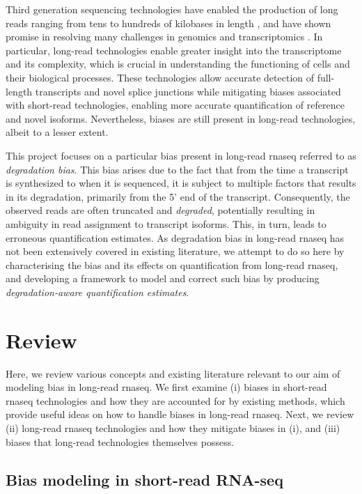 
Third generation sequencing technologies have enabled the production of long reads ranging from tens to hundreds of kilobases in length \cite{Pollard2018}, and have shown promise in resolving many challenges in genomics and transcriptomics \cite{Bolisetty2015, Byrne2017, DeCoster2019, Liu2019, Mantere2019, Nurk2021}. In particular, long-read technologies enable greater insight into the transcriptome and its complexity, which is crucial in understanding the functioning of cells and their biological processes. These technologies allow accurate detection of full-length transcripts and novel splice junctions while mitigating biases associated with short-read technologies, enabling more accurate quantification of reference and novel isoforms. Nevertheless, biases are still present in long-read technologies, albeit to a lesser extent. 

This project focuses on a particular bias present in long-read \gls{rnaseq} referred to as \textit{degradation bias}. This bias arises due to the fact that from the time a transcript is synthesized to when it is sequenced, it is subject to multiple factors that results in its degradation, primarily from the 5' end of the transcript. Consequently, the observed reads are often truncated and \textit{degraded}, potentially resulting in ambiguity in read assignment to transcript isoforms. This, in turn, leads to erroneous quantification estimates. As degradation bias in long-read \gls{rnaseq} has not been extensively covered in existing literature, we attempt to do so here by characterising the bias and its effects on quantification from long-read \gls{rnaseq}, and developing a framework to model and correct such bias by producing \textit{degradation-aware quantification estimates}.

\section{Review}

Here, we review various concepts and existing literature relevant to our aim of modeling bias in long-read \gls{rnaseq}. We first examine (i) biases in short-read \gls{rnaseq} technologies and how they are accounted for by existing methods, which provide useful ideas on how to handle biases in long-read \gls{rnaseq}. Next, we review (ii) long-read \gls{rnaseq} technologies and how they mitigate biases in (i), and (iii) biases that long-read technologies themselves possess. 

\subsection{Bias modeling in short-read RNA-seq}

